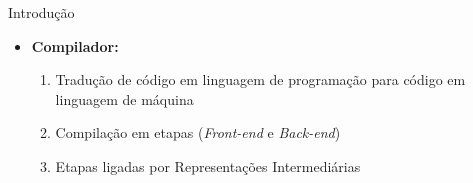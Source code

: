 \begin{frame}{Introdução}
    \begin{itemize}
        \item \textbf{Compilador:}
        \begin{enumerate}
            \item Tradução de código em linguagem de programação para código em linguagem de máquina
            \item Compilação em etapas (\textit{Front-end} e \textit{Back-end})
            \item Etapas ligadas por Representações Intermediárias
        \end{enumerate}
    \end{itemize}

\end{frame}
